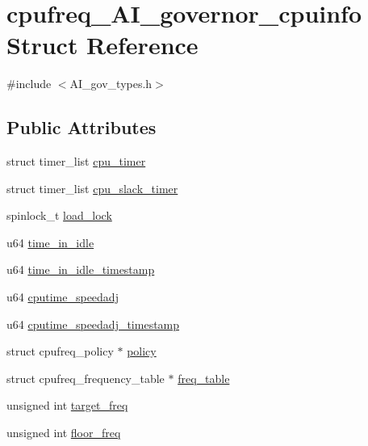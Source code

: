\hypertarget{structcpufreq__AI__governor__cpuinfo}{}\section{cpufreq\+\_\+\+A\+I\+\_\+governor\+\_\+cpuinfo Struct Reference}
\label{structcpufreq__AI__governor__cpuinfo}


{\ttfamily \#include $<$A\+I\+\_\+gov\+\_\+types.\+h$>$}

\subsection*{Public Attributes}
\begin{DoxyCompactItemize}
\item 
struct timer\+\_\+list \hyperlink{structcpufreq__AI__governor__cpuinfo_a9d3787cd4f9ba35254402479d7f34f0a}{cpu\+\_\+timer}
\item 
struct timer\+\_\+list \hyperlink{structcpufreq__AI__governor__cpuinfo_a14b7938eb7221e94229b1f9c6b7b8a1f}{cpu\+\_\+slack\+\_\+timer}
\item 
spinlock\+\_\+t \hyperlink{structcpufreq__AI__governor__cpuinfo_a1132ad97064982f61f59538498fecb24}{load\+\_\+lock}
\item 
u64 \hyperlink{structcpufreq__AI__governor__cpuinfo_ab196cbf0137c70954e5f029b70beddc6}{time\+\_\+in\+\_\+idle}
\item 
u64 \hyperlink{structcpufreq__AI__governor__cpuinfo_a4ea049a3cafcfe8660cbff66ef300076}{time\+\_\+in\+\_\+idle\+\_\+timestamp}
\item 
u64 \hyperlink{structcpufreq__AI__governor__cpuinfo_a95be4af65c3cde04b0b7540b857b86a0}{cputime\+\_\+speedadj}
\item 
u64 \hyperlink{structcpufreq__AI__governor__cpuinfo_a940271c8dea7b49ef28959ced8b1c89a}{cputime\+\_\+speedadj\+\_\+timestamp}
\item 
struct cpufreq\+\_\+policy $\ast$ \hyperlink{structcpufreq__AI__governor__cpuinfo_a01a250c811378215d7939e345d4eb3c2}{policy}
\item 
struct cpufreq\+\_\+frequency\+\_\+table $\ast$ \hyperlink{structcpufreq__AI__governor__cpuinfo_a510ff58666a5b9ec73f796a1cf5f64a9}{freq\+\_\+table}
\item 
unsigned int \hyperlink{structcpufreq__AI__governor__cpuinfo_aee1b90281966dfbefcf2baa00b75deff}{target\+\_\+freq}
\item 
unsigned int \hyperlink{structcpufreq__AI__governor__cpuinfo_ae40feda085e9ef8cb7b18d3a4150a314}{floor\+\_\+freq}

\end{DoxyCompactItemize}
